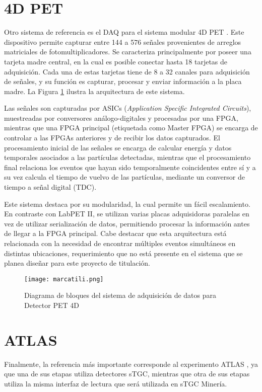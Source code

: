 \newpage
\section{4D PET}
\label{par:4dpet}
	Otro sistema de referencia es el DAQ para el sistema modular 4D PET \cite{Marcatili2011DevelopmentDetector}. Este dispositivo permite capturar entre 144 a 576 señales provenientes de arreglos matriciales de fotomultiplicadores. Se caracteriza principalmente por poseer una tarjeta madre central, en la cual es posible conectar hasta 18 tarjetas de adquisición. Cada una de estas tarjetas tiene de 8 a 32 canales para adquisición de señales, y su función es capturar, procesar y enviar información a la placa madre. La Figura \ref{fig:marcatili} ilustra la arquitectura de este sistema.
		
	Las señales son capturadas por ASICs (\textit{Application Specific Integrated Circuits}), muestreadas por conversores análogo-digitales y procesadas por una FPGA, mientras que una FPGA principal (etiquetada como Master FPGA) se encarga de controlar a las FPGAs anteriores y de recibir los datos capturados. El procesamiento inicial de las señales se encarga de calcular energía y datos temporales asociados a las partículas detectadas, mientras que el procesamiento final relaciona los eventos que hayan sido temporalmente coincidentes entre sí y a su vez calcula el tiempo de vuelvo de las partículas, mediante un conversor de tiempo a señal digital (TDC).
	       	
	Este sistema destaca por su modularidad, la cual permite un fácil escalamiento. En contraste con LabPET II, se utilizan varias placas adquisidoras paralelas en vez de utilizar serialización de datos, permitiendo procesar la información antes de llegar a la FPGA principal. Cabe destacar que esta arquitectura está relacionada con la necesidad de encontrar múltiples eventos simultáneos en distintas ubicaciones, requerimiento que no está presente en el sistema que se planea diseñar para este proyecto de titulación. 
	
	\begin{figure}[h]
		\centering
		\texttt{[image: marcatili.png]}
		\caption{Diagrama de bloques del sistema de adquisición de datos para Detector PET 4D \cite{Marcatili2011DevelopmentDetector}}
		\label{fig:marcatili}
	\end{figure}
	
\newpage
\section{ATLAS}
\label{sec:atlas}
	Finalmente, la referencia más importante corresponde al experimento ATLAS \cite{Spieler2012ElectronicsAcquisition}, ya que una de sus etapas utiliza detectores sTGC, mientras que otra de sus etapas utiliza la misma interfaz de lectura que será utilizada en sTGC Minería.

